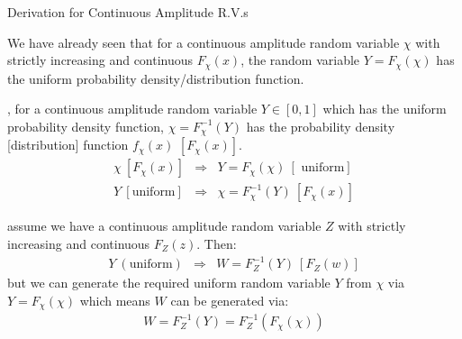 %
%
\begin{slide}{Derivation for Continuous Amplitude R.V.s}
\begin{titlelist}{}{}
\scriptsize
\item<2-> 
We have already seen that for a continuous amplitude random variable
$\chi$ with strictly increasing and continuous $F_{\chi}(x)$,
the random variable $Y=F_{\chi}(\chi)$ has the uniform
probability density/distribution function.

\item<3-> 
, for a continuous amplitude random variable
$Y\in [0,1]$ which has the uniform probability density function,
$\chi=F_{\chi}^{-1}(Y)$ has the probability density [distribution] function
$f_{\chi}(x)$ $[F_{\chi}(x)]$.
\vspace{-3ex}
\begin{eqnarray*}
\chi \ [F_{\chi}(x)] &\Rightarrow &Y=F_{\chi}(\chi) \ [\mbox{ uniform}]\\
Y \ [\mbox{uniform}] &\Rightarrow &\chi=F_{\chi}^{-1}(Y) \ [F_{\chi}(x)]
\end{eqnarray*}

\item<4-> 
 assume we have a continuous amplitude random variable
$Z$ with strictly increasing and continuous $F_{Z}(z).$
Then:
\vspace{-2ex}
\begin{eqnarray}
Y \ (\mbox{uniform}) &\Rightarrow &W=F_{Z}^{-1}(Y) \ [F_{Z}(w)]
\end{eqnarray}
but we can generate the required uniform random variable $Y$
from $\chi$ via $Y=F_{\chi}(\chi)$ which means $W$ can be generated 
 via:
\vspace{-2ex}
\begin{eqnarray}
W=F_{Z}^{-1}(Y)=F_{Z}^{-1}(F_{\chi}(\chi))
\end{eqnarray}

\end{titlelist}
\end{slide}




